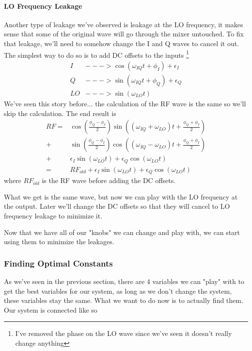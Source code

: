 \documentclass[english, a4paper, 12pt, twoside]{article}
\numberwithin{equation}{section} %
\begin{document}
\paragraph*{LO Frequency Leakage}
Another type of leakage we've observed is leakage at the LO frequency, it makes sense that some of the original wave will go through the mixer untouched. To fix that leakage, we'll need to somehow change the I and Q waves to cancel it out. The simplest way to do so is to add DC offsets to the inputs \footnote{I've removed the phase on the LO wave since we've seen it doesn't really change anything}
\begin{align*}
    I &---> \cos(\omega_{IQ} t + \phi_I) + \epsilon_I\\
    Q &---> \sin(\omega_{IQ} t + \phi_Q) + \epsilon_Q\\
    LO &---> \sin(\omega_{LO}t)
\end{align*}
We've seen this story before... the calculation of the RF wave is the same so we'll skip the calculation. The end result is
\begin{align*}
RF = &\cos(\frac{\phi_Q - \phi_I}{2})\sin((\omega_{IQ} + \omega_{LO})t + \frac{\phi_Q + \phi_I}{2}) \\
   + &\sin(\frac{\phi_Q - \phi_I}{2})\cos((\omega_{IQ} - \omega_{LO})t + \frac{\phi_Q + \phi_I}{2}) \\
   + &\epsilon_I  \sin(\omega_{LO}t) + \epsilon_Q  \cos(\omega_{LO}t) \\
   = &RF_{old} + \epsilon_I  \sin(\omega_{LO}t) + \epsilon_Q  \cos(\omega_{LO}t)
\end{align*}
where \(RF_{old}\) is the RF wave before adding the DC offsets. 

What we get is the same wave, but now we can play with the LO frequency at the output. Later we'll change the DC offsets so that they will cancel to LO frequency leakage to minimize it.

Now that we have all of our "knobs" we can change and play with, we can start using them to minimize the leakages.


\subsubsection{Finding Optimal Constants} %
As we've seen in the previous section, there are 4 variables we can "play" with to get the best variables for our system, as long as we don't change the system, these variables stay the same. What we want to do now is to actually find them. Our system is connected like so
\end{document}
